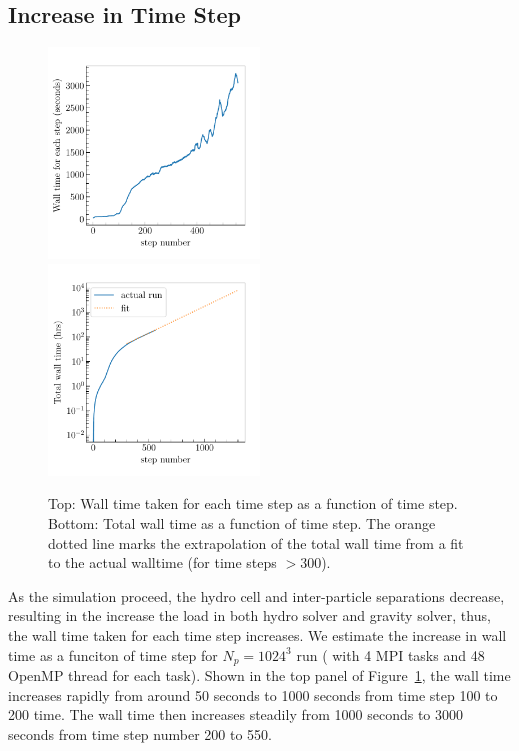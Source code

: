\documentclass[letterpaper,11pt]{article}
\begin{document}
\subsection{Increase in Time Step }
\begin{figure}
\centering
\includegraphics[width=0.5\textwidth]{code/plot_step.pdf}
\includegraphics[width=0.5\textwidth]{code/plot_totalstep_fit.pdf}
\caption{Top: Wall time taken for each time step as a function of time step. Bottom: Total wall time as a function of time step. The orange dotted line marks the extrapolation of the total wall time from a fit to the actual walltime (for time steps $> 300$). 
}  
\label{fig:step}
\end{figure}
As the simulation proceed, the hydro cell and inter-particle separations decrease, resulting in the increase the load in both hydro solver and gravity solver, thus, the wall time taken for each time step increases. We estimate the increase in wall time as a funciton of time step for $N_p=1024^3$ run ( with 4 MPI tasks and 48 OpenMP thread for each task).  Shown in the top panel of Figure~\ref{fig:step}, the wall time increases rapidly from around 50 seconds to 1000 seconds from time step 100 to 200 time. The wall time then increases steadily from 1000 seconds to 3000 seconds from time step number 200 to 550.
\end{document}
